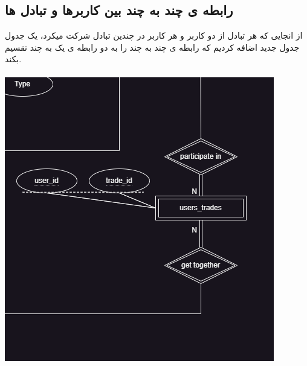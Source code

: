 \documentclass{book}
\begin{document}
\newpage

\subsection{رابطه ی چند به چند بین کاربرها و تبادل ها}
از انجایی که هر تبادل از دو کاربر و هر کاربر در چندین تبادل شرکت میکرد، یک جدول جدول جدید اضافه کردیم که رابطه ی چند به چند را به دو رابطه ی یک به چند تقسیم بکند.
\\ \\
\includegraphics[width=0.8\linewidth]{users_trades.png}
\newpage
\end{document}
